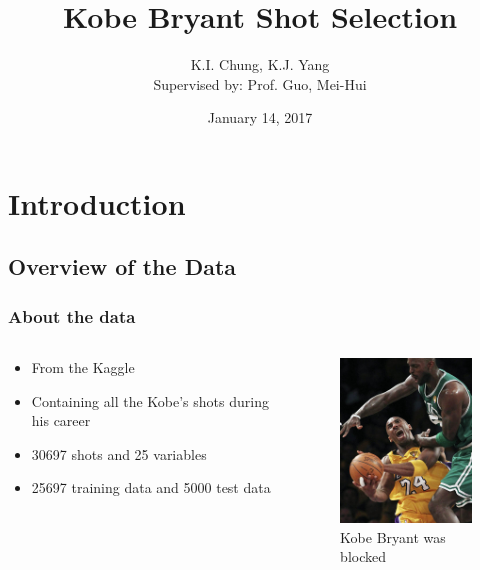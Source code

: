 \documentclass{beamer}
\title{Kobe Bryant Shot Selection}
\author[K.I. Chung, K.J. Yang]{K.I. Chung, K.J. Yang\\{\small Supervised by: Prof. Guo, Mei-Hui }}
\date{January 14, 2017}
\begin{document}
\frame{\titlepage}
\section[Outline]{}
\frame{\tableofcontents}
 
\section{Introduction}
\subsection{Overview of the Data}

\frame
{
  	\frametitle{About the data}
	\begin{columns}
		\begin{column}{0.5\textwidth}
			\begin{itemize}
				\item {From the Kaggle}
				\item{Containing all the Kobe's shots during his career}
				\item{30697 shots and 25 variables}
				\item{25697 training data and 5000 test data}
			\end{itemize}

		\end{column}
  		\begin{column}{0.5\textwidth}
			\begin{figure}
    				\begin{center}
        					\includegraphics[width=130pt]{figure/Kobe_1.png}
        					\caption{Kobe Bryant was blocked}
       					\label{}
    				\end{center}
			\end{figure}
		\end{column}
	\end{columns}
}
\end{document}
